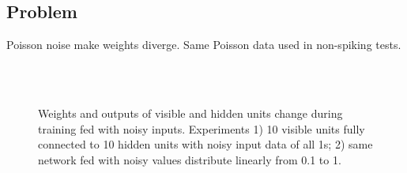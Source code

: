 \documentclass{article}
\begin{document}
\subsection{Problem}
Poisson noise make weights diverge.
Same Poisson data used in non-spiking tests.
\begin{figure}
	\\
	\\
	\caption{Weights and outputs of visible and hidden units change during training fed with noisy inputs. 
		Experiments 1) 10 visible units fully connected to 10 hidden units with noisy input data of all 1s; 2) same network fed with noisy values distribute linearly from 0.1 to 1.}
\end{figure}
\end{document}
